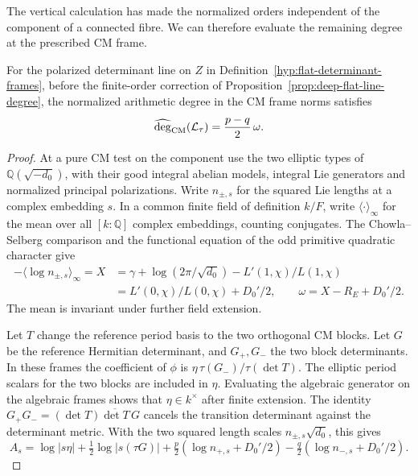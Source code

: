 The vertical calculation has made the normalized orders independent of the component of a connected fibre. We can therefore evaluate the remaining degree at the prescribed CM frame.

\begin{lemma}\label{lem:flat-cm-degree}
For the polarized determinant line on \(Z\) in
Definition~\ref{hyp:flat-determinant-frames}, before the finite-order
correction of Proposition~\ref{prop:deep-flat-line-degree}, the normalized arithmetic degree in the CM frame norms satisfies
\[
 \widehat{\deg}_{\rm CM}(\mathcal L_\tau)=\frac{p-q}{2}\,\omega.
\]

\end{lemma}
\begin{proof}
At a pure CM test on the component use the two elliptic types of
\(\mathbb Q(\sqrt{-d_0})\), with their good integral abelian models,
integral Lie generators and normalized principal polarizations. Write
\(n_{\pm,s}\) for the squared Lie lengths at a complex embedding \(s\).
In a common finite field of definition \(k/F\), write \(\langle
\cdot\rangle_\infty\) for the mean over all \([k:\mathbb Q]\) complex
embeddings, counting conjugates. The Chowla--Selberg comparison and
the functional equation of the odd primitive quadratic character give
\[
 \begin{aligned}
 -\langle\log n_{\pm,s}\rangle_\infty=X
 &=\gamma+\log(2\pi/\sqrt{d_0})-L'(1,\chi)/L(1,\chi)\\
 &=L'(0,\chi)/L(0,\chi)+D_0'/2,\qquad
 \omega=X-R_E+D_0'/2 .
 \end{aligned}
\]
The mean is invariant under further field extension.
\cite{colmez-chowla-selberg}\label{cor:deep-cover-flat-degree-8}

Let \(T\) change the reference period basis to the two orthogonal
CM blocks. Let \(G\) be the reference Hermitian determinant, and
\(G_+,G_-\) the two block determinants. In these frames the
coefficient of \(\phi\) is \(\eta\,\tau(G_-)/\tau(\det T)\).
The elliptic period scalars for the two blocks are included in
\(\eta\). Evaluating the algebraic generator on the algebraic
frames shows that \(\eta\in k^\times\) after finite extension.
The identity \(G_+G_-=(\det T)\overline{\det T}\,G\) cancels the
transition determinant against the determinant metric. With the
two squared length scales \(n_{\pm,s}\sqrt{d_0}\), this gives
\[
 A_s=\log|s\eta|+\tfrac12\log|s(\tau G)|
       +\tfrac p2(\log n_{+,s}+D_0'/2)
       -\tfrac q2(\log n_{-,s}+D_0'/2).
\]
\label{cor:deep-cover-flat-degree-9}


\end{proof}
